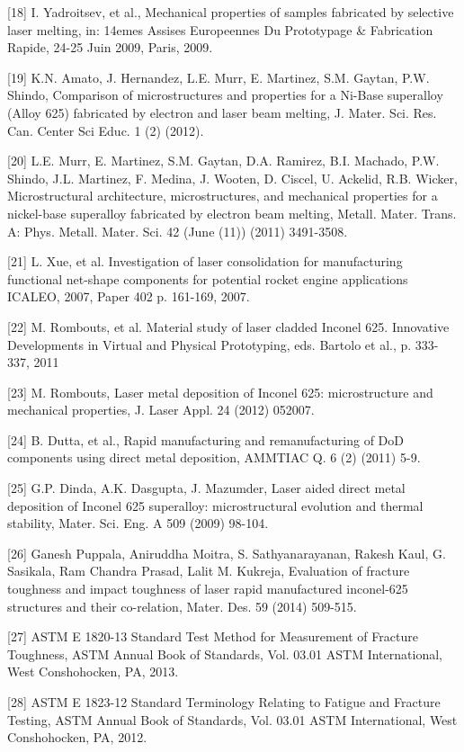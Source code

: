 \documentclass[10pt]{article}
\begin{document}
[18] I. Yadroitsev, et al., Mechanical properties of samples fabricated by selective laser melting, in: 14emes Assises Europeennes Du Prototypage \& Fabrication Rapide, 24-25 Juin 2009, Paris, 2009.

[19] K.N. Amato, J. Hernandez, L.E. Murr, E. Martinez, S.M. Gaytan, P.W. Shindo, Comparison of microstructures and properties for a Ni-Base superalloy (Alloy 625) fabricated by electron and laser beam melting, J. Mater. Sci. Res. Can. Center Sci Educ. 1 (2) (2012).

[20] L.E. Murr, E. Martinez, S.M. Gaytan, D.A. Ramirez, B.I. Machado, P.W. Shindo, J.L. Martinez, F. Medina, J. Wooten, D. Ciscel, U. Ackelid, R.B. Wicker, Microstructural architecture, microstructures, and mechanical properties for a nickel-base superalloy fabricated by electron beam melting, Metall. Mater. Trans. A: Phys. Metall. Mater. Sci. 42 (June (11)) (2011) 3491-3508.

[21] L. Xue, et al. Investigation of laser consolidation for manufacturing functional net-shape components for potential rocket engine applications ICALEO, 2007, Paper 402 p. 161-169, 2007.

[22] M. Rombouts, et al. Material study of laser cladded Inconel 625. Innovative Developments in Virtual and Physical Prototyping, eds. Bartolo et al., p. 333-337, 2011

[23] M. Rombouts, Laser metal deposition of Inconel 625: microstructure and mechanical properties, J. Laser Appl. 24 (2012) 052007.

[24] B. Dutta, et al., Rapid manufacturing and remanufacturing of DoD components using direct metal deposition, AMMTIAC Q. 6 (2) (2011) 5-9.

[25] G.P. Dinda, A.K. Dasgupta, J. Mazumder, Laser aided direct metal deposition of Inconel 625 superalloy: microstructural evolution and thermal stability, Mater. Sci. Eng. A 509 (2009) 98-104.

[26] Ganesh Puppala, Aniruddha Moitra, S. Sathyanarayanan, Rakesh Kaul, G. Sasikala, Ram Chandra Prasad, Lalit M. Kukreja, Evaluation of fracture toughness and impact toughness of laser rapid manufactured inconel-625 structures and their co-relation, Mater. Des. 59 (2014) 509-515.

[27] ASTM E 1820-13 Standard Test Method for Measurement of Fracture Toughness, ASTM Annual Book of Standards, Vol. 03.01 ASTM International, West Conshohocken, PA, 2013.

[28] ASTM E 1823-12 Standard Terminology Relating to Fatigue and Fracture Testing, ASTM Annual Book of Standards, Vol. 03.01 ASTM International, West Conshohocken, PA, 2012.
\end{document}
